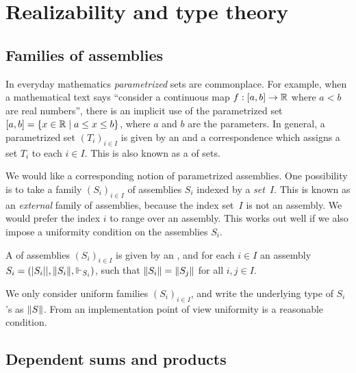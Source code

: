 \chapter{Realizability and type theory}
\label{cha:type-theory-real}

\section{Families of assemblies}
\label{sec:families-assemblies}

In everyday mathematics \emph{parametrized} sets are commonplace. For
example, when a mathematical text says ``consider a continuous map $f
: [a,b] \to \mathbb{R}$ where $a < b$ are real numbers'', there is an
implicit use of the parametrized set $[a,b] = \{x \in \mathbb{R} \mid a
  \leq x \leq b\}$, where $a$ and $b$ are the parameters. In general, a
parametrized set $(T_i)_{i \in I}$ is given by an 
and a correspondence which assigns a set $T_i$ to each $i \in I$. This
is also known as a  of sets.

We would like a corresponding notion of parametrized assemblies. One
possibility is to take a family $(S_i)_{i \in I}$ of assemblies
$S_i$ indexed by a \emph{set}~$I$. This is known as an
\emph{external} family of assemblies, because the index set~$I$ is not
an assembly. We would prefer the index $i$ to range over an assembly.
This works out well if we also impose a uniformity condition on the
assemblies $S_i$.

\begin{definition}
  A  of assemblies $(S_i)_{i \in I}$
  is given by an , and for each $i \in
  I$ an assembly $S_i = (|S_i||, \|S_i\|, {\Vdash_{S_i}})$, such that $\|S_i\| = \|S_j\|$
  for all $i, j \in I$.
\end{definition}

We only consider uniform families $(S_i)_{i \in I}$, and
write the underlying type of $S_i$'s as $\|S\|$. From an
implementation point of view uniformity is a reasonable condition.


\section{Dependent sums and products}
\label{sec:depend-sums-prod}


